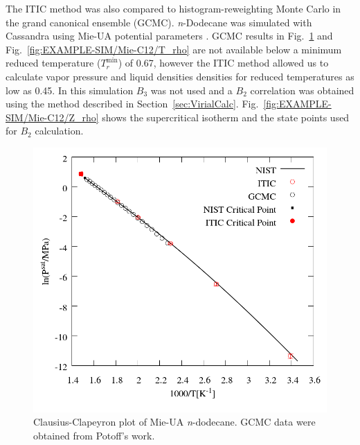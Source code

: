 \documentclass[%
 aip,
 jcp,
 sd,%
 amsmath,amssymb,
 reprint,%
]{revtex4-1}
\begin{document}
The ITIC method was also compared to histogram-reweighting Monte Carlo in the grand canonical ensemble (GCMC). \textit{n}-Dodecane was simulated with Cassandra using Mie-UA potential parameters \cite{Potoff2009}. GCMC results in Fig.~\ref{fig:EXAMPLE-SIM/Mie-C12/Psat} and Fig.~\ref{fig:EXAMPLE-SIM/Mie-C12/T_rho} are not available below a minimum reduced temperature ($T_r^{\mathrm{min}}$) of 0.67, however the ITIC method allowed us to calculate vapor pressure and liquid densities densities for reduced temperatures as low as 0.45. In this simulation $B_3$ was not used and a $B_2$ correlation was obtained using the method described in Section~\ref{sec:VirialCalc}. Fig.~\ref{fig:EXAMPLE-SIM/Mie-C12/Z_rho} shows the supercritical isotherm and the state points used for $B_2$ calculation.

\begin{figure}
\includegraphics[scale=0.30]{Figures/EXAMPLE-SIM_Mie-C12_psat.png}
\caption{Clausius-Clapeyron plot of Mie-UA \textit{n}-dodecane. GCMC data were obtained from Potoff's work\cite{Potoff2009}.}
\label{fig:EXAMPLE-SIM/Mie-C12/Psat}
\end{figure}
\end{document}
